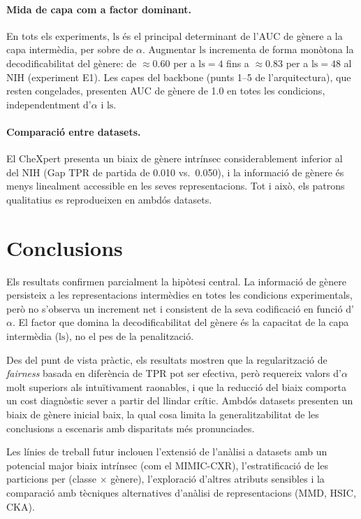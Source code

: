 \documentclass[a4paper,12pt,twoside]{ThesisStyle}
\begin{document}
\paragraph{Mida de capa com a factor dominant.}
En tots els experiments, $\text{ls}$ és el principal determinant de l'AUC de gènere a la capa intermèdia, per sobre de $\alpha$. Augmentar $\text{ls}$ incrementa de forma monòtona la decodificabilitat del gènere: de $\approx 0.60$ per a $\text{ls} = 4$ fins a $\approx 0.83$ per a $\text{ls} = 48$ al NIH (experiment E1). Les capes del backbone (punts 1--5 de l'arquitectura), que resten congelades, presenten AUC de gènere de 1.0 en totes les condicions, independentment d'$\alpha$ i $\text{ls}$.

\paragraph{Comparació entre datasets.}
El CheXpert presenta un biaix de gènere intrínsec considerablement inferior al del NIH (Gap TPR de partida de 0.010 vs.\ 0.050), i la informació de gènere és menys linealment accessible en les seves representacions. Tot i això, els patrons qualitatius es reprodueixen en ambdós datasets.

\section*{Conclusions}

Els resultats confirmen parcialment la hipòtesi central. La informació de gènere persisteix a les representacions intermèdies en totes les condicions experimentals, però no s'observa un increment net i consistent de la seva codificació en funció d'$\alpha$. El factor que domina la decodificabilitat del gènere és la capacitat de la capa intermèdia ($\text{ls}$), no el pes de la penalització.

Des del punt de vista pràctic, els resultats mostren que la regularització de \textit{fairness} basada en diferència de TPR pot ser efectiva, però requereix valors d'$\alpha$ molt superiors als intuïtivament raonables, i que la reducció del biaix comporta un cost diagnòstic sever a partir del llindar crític. Ambdós datasets presenten un biaix de gènere inicial baix, la qual cosa limita la generalitzabilitat de les conclusions a escenaris amb disparitats més pronunciades.

Les línies de treball futur inclouen l'extensió de l'anàlisi a datasets amb un potencial major biaix intrínsec (com el MIMIC-CXR), l'estratificació de les particions per (classe $\times$ gènere), l'exploració d'altres atributs sensibles i la comparació amb tècniques alternatives d'anàlisi de representacions (MMD, HSIC, CKA).

\backmatter



\end{document}
